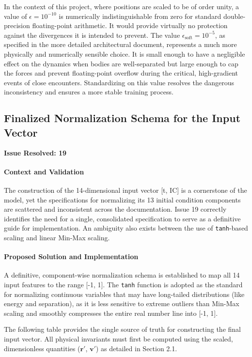 \documentclass[11pt, a4paper]{article}
\begin{document}
In the context of this project, where positions are scaled to be of order unity, a value of $\epsilon = 10^{-10}$ is numerically indistinguishable from zero for standard double-precision floating-point arithmetic. It would provide virtually no protection against the divergences it is intended to prevent. The value $\epsilon_{\text{soft}} = 10^{-5}$, as specified in the more detailed architectural document, represents a much more physically and numerically sensible choice. It is small enough to have a negligible effect on the dynamics when bodies are well-separated but large enough to cap the forces and prevent floating-point overflow during the critical, high-gradient events of close encounters. Standardizing on this value resolves the dangerous inconsistency and ensures a more stable training process.

\subsection{Finalized Normalization Schema for the Input Vector}
\textbf{Issue Resolved: 19}
\paragraph{Context and Validation}
The construction of the 14-dimensional input vector [t, IC] is a cornerstone of the model, yet the specifications for normalizing its 13 initial condition components are scattered and inconsistent across the documentation. Issue 19 correctly identifies the need for a single, consolidated specification to serve as a definitive guide for implementation. An ambiguity also exists between the use of \texttt{tanh}-based scaling and linear Min-Max scaling.

\paragraph{Proposed Solution and Imple\-mentation}
A definitive, component-wise normalization schema is established to map all 14 input features to the range [-1, 1]. The \texttt{tanh} function is adopted as the standard for normalizing continuous variables that may have long-tailed distributions (like energy and separation), as it is less sensitive to extreme outliers than Min-Max scaling and smoothly compresses the entire real number line into [-1, 1].

The following table provides the single source of truth for constructing the final input vector. All physical invariants must first be computed using the scaled, dimensionless quantities ($\mathbf{r}'$, $\mathbf{v}'$) as detailed in Section 2.1.
\end{document}
